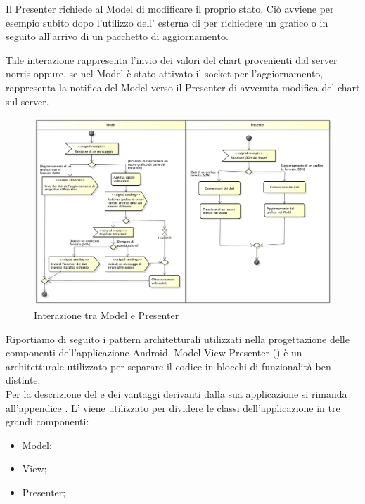         Il Presenter richiede al Model di modificare il proprio stato. Ciò avviene per esempio subito dopo l'utilizzo dell' esterna di  per richiedere un grafico o in seguito all'arrivo di un pacchetto di aggiornamento.

        Tale interazione rappresenta l'invio dei valori del chart provenienti dal server norris oppure, se nel Model è stato attivato il socket per l'aggiornamento, rappresenta la notifica del Model verso il Presenter di avvenuta modifica del chart sul server.
        
			\begin{figure}[H]\centering
	        		\includegraphics[width=\textwidth]{SpecificaTecnica/Pics/Model-Presenter}
	        		\caption{Interazione tra Model e Presenter}
	    		\end{figure}
        
    Riportiamo di seguito i pattern architetturali utilizzati nella progettazione delle componenti dell'applicazione Android.
            Model-View-Presenter () è un  architetturale utilizzato per separare il codice in blocchi di funzionalità ben distinte.\\
            Per la descrizione del  e dei vantaggi derivanti dalla sua applicazione si rimanda all'appendice .
                L' viene utilizzato per dividere le classi dell'applicazione  in tre grandi componenti:
                \begin{itemize}
                    \item Model;
                    \item View;
                    \item Presenter;
                \end{itemize}

